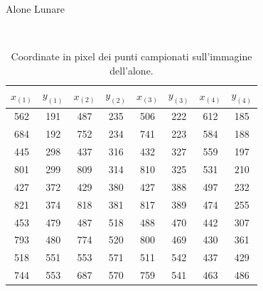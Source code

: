 \documentclass{report}[a4paper,11pt]
\begin{document}
\begin{table}[htb!]
  \begin{center}
  \begin{large}
  Alone Lunare
  \end{large}\\
	\begin{tabular}{cccccccc}
	\toprule
	$x_{(1)}$  & $y_{(1)}$  & $x_{(2)}$  & $y_{(2)}$  & $x_{(3)}$  & $y_{(3)}$ & $x_{(4)}$  & $y_{(4)}$ \\
	\midrule
	\midrule
	562 & 191 & 487 & 235 & 506 & 222 & 612 & 185 \\
	                                         
	684 & 192 & 752 & 234 & 741 & 223 & 584 & 188 \\
	                                         
	445 & 298 & 437 & 316 & 432 & 327 & 559 & 197 \\
	                                         
	801 & 299 & 809 & 314 & 810 & 325 & 531 & 210 \\
	                                         
	427 & 372 & 429 & 380 & 427 & 388 & 497 & 232 \\
	                                         
	821 & 374 & 818 & 381 & 817 & 389 & 474 & 255 \\
	                                         
	453 & 479 & 487 & 518 & 488 & 470 & 442 & 307 \\
	                                         
	793 & 480 & 774 & 520 & 800 & 469 & 430 & 361 \\
	                                         
	518 & 551 & 553 & 571 & 511 & 542 & 437 & 429 \\
	                                         
	744 & 553 & 687 & 570 & 759 & 541 & 463 & 486 \\
	\bottomrule
	\end{tabular}
  \end{center}
  \caption{Coordinate in pixel dei punti campionati sull'immagine dell'alone.}
\end{table}
\end{document}

